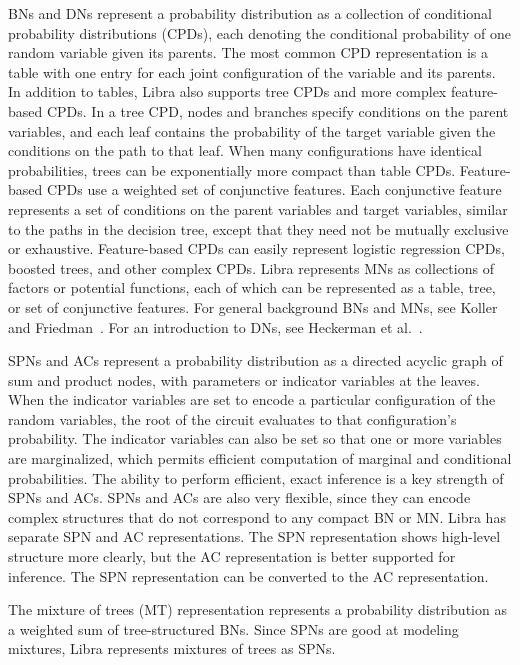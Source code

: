 \documentclass[11pt]{article}
\begin{document}
BNs and DNs represent a probability distribution as a collection of
conditional probability distributions (CPDs), each denoting the
conditional probability of one random variable given its parents.  The
most common CPD representation is a table with one entry for each
joint configuration of the variable and its parents.  In addition to
tables, Libra also supports tree CPDs and more complex feature-based
CPDs.  In a tree CPD, nodes and branches specify conditions on the
parent variables, and each leaf contains the probability of the target
variable given the conditions on the path to that leaf.  When many
configurations have identical probabilities, trees can be
exponentially more compact than table CPDs.  Feature-based CPDs use a
weighted set of conjunctive features.  Each conjunctive feature
represents a set of conditions on the parent variables and target
variables, similar to the paths in the decision tree, except that they
need not be mutually exclusive or exhaustive.  Feature-based CPDs can
easily represent logistic regression CPDs, boosted trees, and other
complex CPDs.  Libra represents MNs as collections of factors or
potential functions, each of which can be represented as a table,
tree, or set of conjunctive features.  For general background BNs and
MNs, see Koller and Friedman~\cite{koller&friedman09}.  For an
introduction to DNs, see Heckerman et al.~\cite{heckerman&al00}.

SPNs and ACs represent a probability distribution as a directed
acyclic graph of sum and product nodes, with parameters or indicator
variables at the leaves.  When the indicator variables are set to
encode a particular configuration of the random variables, the root of
the circuit evaluates to that configuration's probability.  The
indicator variables can also be set so that one or more variables are
marginalized, which permits efficient computation of marginal and
conditional probabilities.  The ability to perform efficient, exact
inference is a key strength of SPNs and ACs.  SPNs and ACs are also
very flexible, since they can encode complex structures that do not
correspond to any compact BN or MN.  Libra has separate SPN and AC
representations.  The SPN representation shows high-level structure
more clearly, but the AC representation is better supported for
inference.  The SPN representation can be converted to the AC
representation.

The mixture of trees (MT) representation represents a probability
distribution as a weighted sum of tree-structured BNs.  Since SPNs are
good at modeling mixtures, Libra represents mixtures of trees as SPNs.
\end{document}
